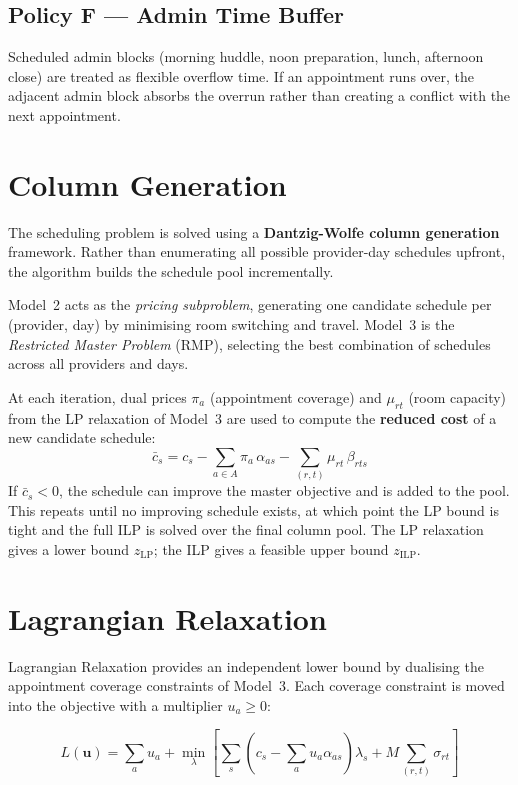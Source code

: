 \documentclass[12pt]{article}
\begin{document}
\subsection*{Policy F --- Admin Time Buffer}

Scheduled admin blocks (morning huddle, noon preparation, lunch, afternoon close) are
treated as flexible overflow time. If an appointment runs over, the adjacent admin block
absorbs the overrun rather than creating a conflict with the next appointment.

\section{Column Generation}

The scheduling problem is solved using a \textbf{Dantzig-Wolfe column generation}
framework. Rather than enumerating all possible provider-day schedules upfront, the
algorithm builds the schedule pool incrementally.

Model~2 acts as the \emph{pricing subproblem}, generating one candidate schedule per
(provider, day) by minimising room switching and travel. Model~3 is the
\emph{Restricted Master Problem} (RMP), selecting the best combination of schedules
across all providers and days.

At each iteration, dual prices $\pi_a$ (appointment coverage) and $\mu_{rt}$ (room
capacity) from the LP relaxation of Model~3 are used to compute the \textbf{reduced cost}
of a new candidate schedule:
\[
\bar{c}_s = c_s - \sum_{a \in A} \pi_a\,\alpha_{as} - \sum_{(r,t)} \mu_{rt}\,\beta_{rts}
\]
If $\bar{c}_s < 0$, the schedule can improve the master objective and is added to the pool.
This repeats until no improving schedule exists, at which point the LP bound is tight and
the full ILP is solved over the final column pool. The LP relaxation gives a lower bound
$z_{\mathrm{LP}}$; the ILP gives a feasible upper bound $z_{\mathrm{ILP}}$.

\section{Lagrangian Relaxation}

Lagrangian Relaxation provides an independent lower bound by dualising the appointment
coverage constraints of Model~3. Each coverage constraint is moved into the objective
with a multiplier $u_a \geq 0$:

\[
L(\mathbf{u}) = \sum_{a} u_a
+ \min_{\lambda} \left[
    \sum_{s} \!\left( c_s - \sum_{a} u_a \alpha_{as} \right) \lambda_s
    + M \sum_{(r,t)} \sigma_{rt}
\right]
\]
\end{document}
